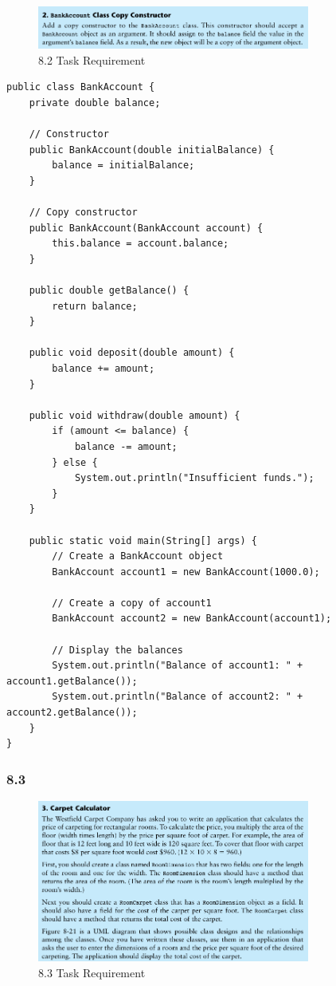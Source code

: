 \documentclass{article}
\begin{document}
\begin{figure}[H]
    \centering
    \includegraphics[width=0.8\textwidth]{./Assets/Task requirements/Assignment11/8.2.png}
    \caption{8.2 Task Requirement}
\end{figure}

\begin{lstlisting}[caption=BankAccount.java]
public class BankAccount {
    private double balance;

    // Constructor
    public BankAccount(double initialBalance) {
        balance = initialBalance;
    }

    // Copy constructor
    public BankAccount(BankAccount account) {
        this.balance = account.balance;
    }

    public double getBalance() {
        return balance;
    }

    public void deposit(double amount) {
        balance += amount;
    }

    public void withdraw(double amount) {
        if (amount <= balance) {
            balance -= amount;
        } else {
            System.out.println("Insufficient funds.");
        }
    }

    public static void main(String[] args) {
        // Create a BankAccount object
        BankAccount account1 = new BankAccount(1000.0);

        // Create a copy of account1
        BankAccount account2 = new BankAccount(account1);

        // Display the balances
        System.out.println("Balance of account1: " + account1.getBalance());
        System.out.println("Balance of account2: " + account2.getBalance());
    }
}
\end{lstlisting}

\subsubsection*{8.3}

\begin{figure}[H]
    \centering
    \includegraphics[width=0.8\textwidth]{./Assets/Task requirements/Assignment11/8.3.png}
    \caption{8.3 Task Requirement}
\end{figure}
\end{document}
